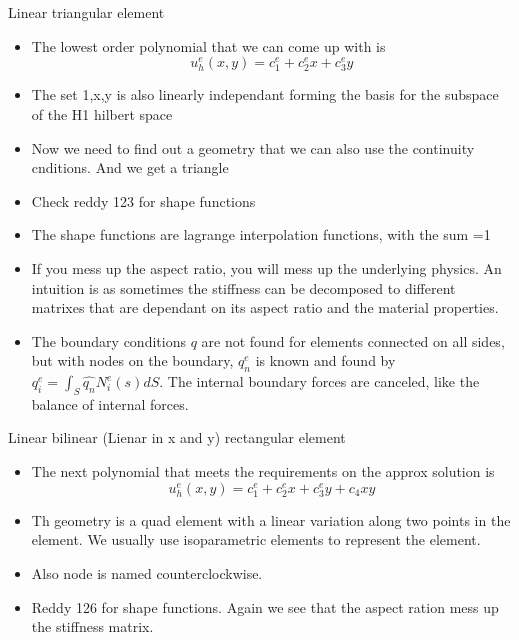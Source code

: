 	\begin{frame}{Linear triangular element}
		\begin{itemize}
			\item The lowest order polynomial that we can come up with is
			\begin{equation}
			u_h^e(x,y) =c_1^e + c_2^ex +c_3^ey
			\end{equation}
			\item The set {1,x,y} is also linearly independant forming the basis for the subspace of the H1 hilbert space
			\item Now we need to find out a geometry that we can also use the continuity cnditions. And we get a triangle
			\item Check reddy 123 for shape functions
			\item  The shape functions are lagrange interpolation functions, with the sum =1
			\item If you mess up the aspect ratio, you will mess up the underlying physics. An intuition is as sometimes the stiffness can be decomposed to different matrixes that are dependant on its aspect ratio and the material properties.
			\item The boundary conditions $q$ are not found for elements connected on all sides, but with nodes on the boundary, $q_n^e$ is known and found by $q_i^e = \int_S \hat{q_n}N_i^e(s)dS$.  The internal boundary forces are canceled, like the balance of internal forces.
		\end{itemize}
	\end{frame}



	\begin{frame}{Linear bilinear (Lienar in x and y) rectangular element}
		\begin{itemize}
			\item The next polynomial that meets the requirements on the approx solution is 
			\begin{equation}
				u_h^e(x,y) =c_1^e + c_2^ex +c_3^ey + c_4xy
			\end{equation}
			\item  Th geometry is a quad element with a linear variation along two points in the element. We usually use isoparametric elements to represent the element.
			\item Also node is named counterclockwise.
			\item Reddy 126 for shape functions. Again we see that the aspect ration mess up the stiffness matrix. 
		\end{itemize}
	\end{frame}



